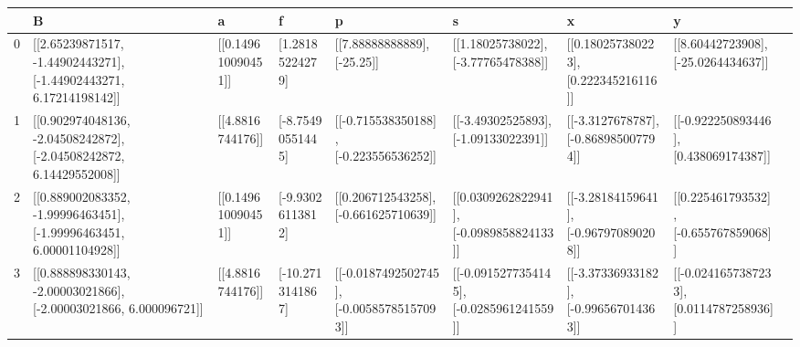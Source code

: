 \documentclass[10pt]{article}
\begin{document}
\begin{tabular}{*{9}{p{2.5cm}}}
\hline
{} &                                                                    B &                   a &                 f &                                          p &                                         s &                                      x &                                        y \\
\hline
0 &   [[2.65239871517, -1.44902443271], [-1.44902443271, 6.17214198142]] &  [[0.149610090451]] &   [1.28185224279] &                [[7.88888888889], [-25.25]] &       [[1.18025738022], [-3.77765478388]] &   [[0.180257380223], [0.222345216116]] &      [[8.60442723908], [-25.0264434637]] \\
1 &  [[0.902974048136, -2.04508242872], [-2.04508242872, 6.14429552008]] &    [[4.8816744176]] &  [-8.75490551445] &     [[-0.715538350188], [-0.223556536252]] &      [[-3.49302525893], [-1.09133022391]] &   [[-3.3127678787], [-0.868985007794]] &    [[-0.922250893446], [0.438069174387]] \\
2 &  [[0.889002083352, -1.99996463451], [-1.99996463451, 6.00001104928]] &  [[0.149610090451]] &  [-9.93026113812] &      [[0.206712543258], [-0.661625710639]] &   [[0.0309262822941], [-0.0989858824133]] &  [[-3.28184159641], [-0.967970890208]] &    [[0.225461793532], [-0.655767859068]] \\
3 &    [[0.888898330143, -2.00003021866], [-2.00003021866, 6.000096721]] &    [[4.8816744176]] &  [-10.2713141867] &  [[-0.0187492502745], [-0.00585785157093]] &  [[-0.0915277354145], [-0.0285961241559]] &  [[-3.37336933182], [-0.996567014363]] &  [[-0.0241657387233], [0.0114787258936]] \\
\hline
\end{tabular}
\end{document}
